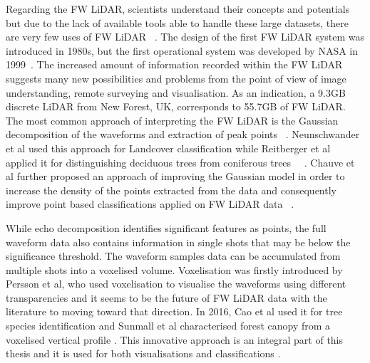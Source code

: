 \documentclass{subfiles}
\begin{document}
	\par Regarding the FW LiDAR, scientists understand their concepts and potentials but due to the lack of available tools able to handle these large datasets, there are very few uses of FW LiDAR ~\cite{Anderson2015}. The design of the first FW LiDAR system was introduced in 1980s, but the first operational system was developed by NASA in 1999~\cite{Chauve2007}. The increased amount of information recorded within the FW LiDAR suggests many new possibilities and problems from the point of view of image understanding, remote surveying and visualisation. As an indication, a 9.3GB discrete LiDAR from New Forest, UK, corresponds to 55.7GB of FW LiDAR. The most common approach of interpreting the FW LiDAR is the Gaussian decomposition of the waveforms and extraction of peak points ~\cite{Wanger2006}. Neunschwander et al used this approach for Landcover classification while Reitberger et al applied it for distinguishing deciduous trees from coniferous trees ~\cite{Neuenschwander2009}~\cite{Reitberger2008}. Chauve et al further proposed an approach of improving the Gaussian model in order to increase the density of the points extracted from the data and consequently improve point based classifications applied on FW LiDAR data ~\cite{Chauve2007}. 
	
	\par While echo decomposition identifies significant features as points, the full waveform data also contains information in single shots that may be below the significance threshold. The waveform samples data can be accumulated from multiple shots into a voxelised volume. Voxelisation was firstly introduced by Persson et al, who used voxelisation to visualise the waveforms using different transparencies \cite{Persson2005} and it seems to be the future of FW LiDAR data with the literature to moving toward that direction. In 2016, Cao et al used it for tree species identification \cite{Cao2016} and Sunmall et al characterised forest canopy from a voxelised vertical profile \cite{Sumnall2016}. This innovative approach is an integral part of this thesis and it is used for both visualisations and classifications \cite{Miltiadou2014}\cite{Miltiadou2015}. 
	
		
	 
	
    
\end{document}
